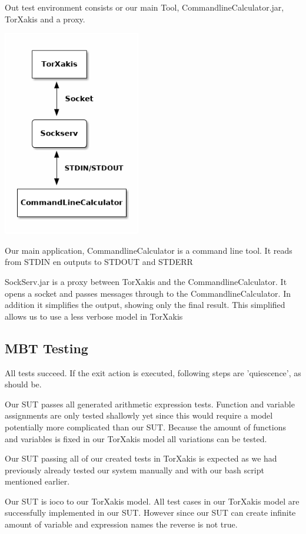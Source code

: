 \documentclass[11pt,a4paper]{article}
\begin{document}
Out test environment consists or our main Tool,
CommandlineCalculator.jar, TorXakis and a proxy.

\includegraphics[width=6cm]{overview.png}

Our main application, CommandlineCalculator is a command line tool. It
reads from STDIN en outputs to STDOUT and STDERR

SockServ.jar is a proxy between TorXakis and the
CommandlineCalculator. It opens a socket and passes messages through
to the CommandlineCalculator. In addition it simplifies the output,
showing only the final result. This simplified allows us to use a less
verbose model in TorXakis

\subsection{MBT Testing}
All tests succeed. If the exit action is executed, following steps are
'quiescence', as should be.

Our SUT passes all generated arithmetic expression tests. Function and
variable assignments are only tested shallowly yet since this would
require a model potentially more complicated than our SUT. Because the
amount of functions and variables is fixed in our TorXakis model all
variations can be tested.

Our SUT passing all of our created tests in TorXakis is expected as
we had previously already tested our system manually and with our bash
script mentioned earlier.

Our SUT is ioco to our TorXakis model. All test cases in our TorXakis
model are successfully implemented in our SUT. However since our SUT can
create infinite amount of variable and expression names the reverse is
not true.
\end{document}
